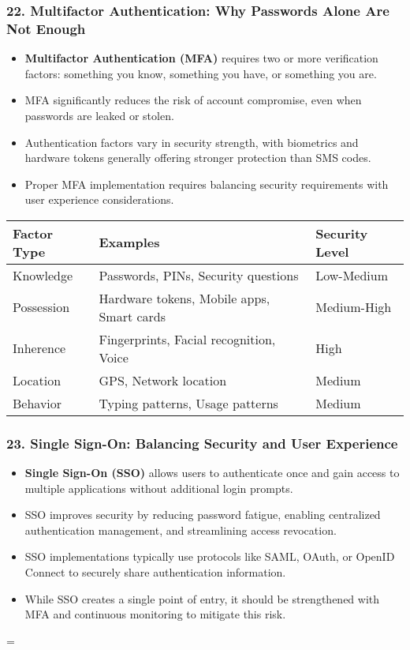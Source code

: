 \documentclass{beamer}
\begin{document}
	\begin{frame}
		\frametitle{22. Multifactor Authentication: Why Passwords Alone Are Not Enough}
		\begin{itemize}
			\item \textbf{Multifactor Authentication (MFA)} requires two or more verification factors: something you know, something you have, or something you are.
			\item MFA significantly reduces the risk of account compromise, even when passwords are leaked or stolen.
			\item Authentication factors vary in security strength, with biometrics and hardware tokens generally offering stronger protection than SMS codes.
			\item Proper MFA implementation requires balancing security requirements with user experience considerations.
		\end{itemize}
		
		\begin{table}
			\scriptsize
			\begin{tabular}{|l|l|l|}
				\hline
				\textbf{Factor Type} & \textbf{Examples} & \textbf{Security Level} \\
				\hline
				Knowledge & Passwords, PINs, Security questions & Low-Medium \\
				\hline
				Possession & Hardware tokens, Mobile apps, Smart cards & Medium-High \\
				\hline
				Inherence & Fingerprints, Facial recognition, Voice & High \\
				\hline
				Location & GPS, Network location & Medium \\
				\hline
				Behavior & Typing patterns, Usage patterns & Medium \\
				\hline
			\end{tabular}
		\end{table}
	\end{frame}
	
	\begin{frame}
		\frametitle{23. Single Sign-On: Balancing Security and User Experience}
		\begin{itemize}
			\item \textbf{Single Sign-On (SSO)} allows users to authenticate once and gain access to multiple applications without additional login prompts.
			\item SSO improves security by reducing password fatigue, enabling centralized authentication management, and streamlining access revocation.
			\item SSO implementations typically use protocols like SAML, OAuth, or OpenID Connect to securely share authentication information.
			\item While SSO creates a single point of entry, it should be strengthened with MFA and continuous monitoring to mitigate this risk.
		\end{itemize}
=
		\end{frame}
		
\end{document}
